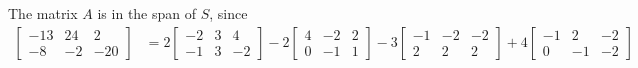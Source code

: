 The matrix $A$ is in the span of $S$, since  
\begin{align*}
\begin{bmatrix} -13 & 24 & 2 \\ -8 & -2 & -20 \end{bmatrix} 
&= 
2\begin{bmatrix} -2 & 3 & 4 \\ -1 & 3 & -2 \end{bmatrix} 
-2\begin{bmatrix} 4 & -2 & 2 \\ 0 & -1 & 1 \end{bmatrix}
-3\begin{bmatrix} -1 & -2 & -2 \\ 2 & 2 & 2 \end{bmatrix}
+ 4\begin{bmatrix} -1 & 2 & -2 \\0 & -1 & -2 \end{bmatrix}
\end{align*}